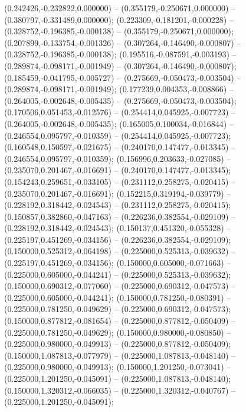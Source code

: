  (0.242426,-0.232822,0.000000) -- (0.355179,-0.250671,0.000000) -- (0.380797,-0.331489,0.000000);
 (0.223309,-0.181201,-0.000228) -- (0.328752,-0.196385,-0.000138) -- (0.355179,-0.250671,0.000000);
 (0.207899,-0.133754,-0.001326) -- (0.307264,-0.146490,-0.000807) -- (0.328752,-0.196385,-0.000138);
 (0.195516,-0.087591,-0.003193) -- (0.289874,-0.098171,-0.001949) -- (0.307264,-0.146490,-0.000807);
 (0.185459,-0.041795,-0.005727) -- (0.275669,-0.050473,-0.003504) -- (0.289874,-0.098171,-0.001949);
 (0.177239,0.004353,-0.008866) -- (0.264005,-0.002648,-0.005435) -- (0.275669,-0.050473,-0.003504);
 (0.170506,0.051453,-0.012576) -- (0.254414,0.045925,-0.007723) -- (0.264005,-0.002648,-0.005435);
 (0.165005,0.100034,-0.016844) -- (0.246554,0.095797,-0.010359) -- (0.254414,0.045925,-0.007723);
 (0.160548,0.150597,-0.021675) -- (0.240170,0.147477,-0.013345) -- (0.246554,0.095797,-0.010359);
 (0.156996,0.203633,-0.027085) -- (0.235070,0.201467,-0.016691) -- (0.240170,0.147477,-0.013345);
 (0.154243,0.259651,-0.033105) -- (0.231112,0.258275,-0.020415) -- (0.235070,0.201467,-0.016691);
 (0.152215,0.319194,-0.039779) -- (0.228192,0.318442,-0.024543) -- (0.231112,0.258275,-0.020415);
 (0.150857,0.382860,-0.047163) -- (0.226236,0.382554,-0.029109) -- (0.228192,0.318442,-0.024543);
 (0.150137,0.451320,-0.055328) -- (0.225197,0.451269,-0.034156) -- (0.226236,0.382554,-0.029109);
 (0.150000,0.525312,-0.064198) -- (0.225000,0.525313,-0.039632) -- (0.225197,0.451269,-0.034156);
 (0.150000,0.605000,-0.071663) -- (0.225000,0.605000,-0.044241) -- (0.225000,0.525313,-0.039632);
 (0.150000,0.690312,-0.077060) -- (0.225000,0.690312,-0.047573) -- (0.225000,0.605000,-0.044241);
 (0.150000,0.781250,-0.080391) -- (0.225000,0.781250,-0.049629) -- (0.225000,0.690312,-0.047573);
 (0.150000,0.877812,-0.081654) -- (0.225000,0.877812,-0.050409) -- (0.225000,0.781250,-0.049629);
 (0.150000,0.980000,-0.080850) -- (0.225000,0.980000,-0.049913) -- (0.225000,0.877812,-0.050409);
 (0.150000,1.087813,-0.077979) -- (0.225000,1.087813,-0.048140) -- (0.225000,0.980000,-0.049913);
 (0.150000,1.201250,-0.073041) -- (0.225000,1.201250,-0.045091) -- (0.225000,1.087813,-0.048140);
 (0.150000,1.320312,-0.066035) -- (0.225000,1.320312,-0.040767) -- (0.225000,1.201250,-0.045091);
